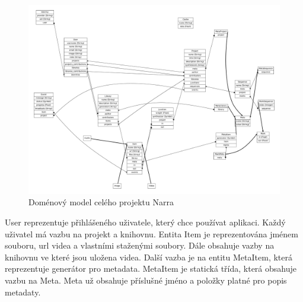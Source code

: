 \begin{figure}[H]
\includegraphics[width=1\textwidth]{./obrazova_priloha/domain_full.pdf}
\caption{Doménový model celého projektu Narra}
\end{figure}

\par User reprezentuje přihlášeného uživatele, který chce používat aplikaci. Každý uživatel má vazbu na projekt a knihovnu. Entita Item je reprezentována jménem souboru, url videa a vlastními staženými soubory. Dále obsahuje vazby na knihovnu ve které jsou uložena videa. Další vazba je na entitu MetaItem, která reprezentuje generátor pro metadata. MetaItem je statická třída, která obsahuje vazbu na Meta. Meta už obsahuje příslušné jméno a položky platné pro popis metadaty.

